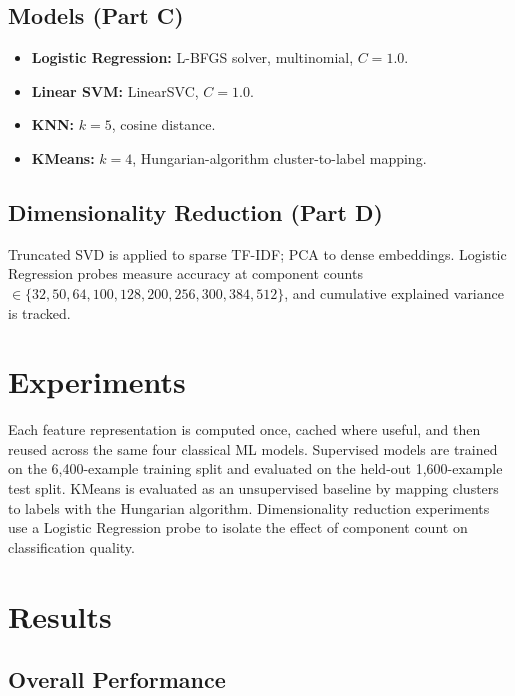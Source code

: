 \documentclass[11pt, a4paper, twocolumn]{article}
\begin{document}
\subsection{Models (Part C)}
\begin{itemize}[leftmargin=*,topsep=2pt,itemsep=1pt]
    \item \textbf{Logistic Regression:} L-BFGS solver, multinomial, $C=1.0$.
    \item \textbf{Linear SVM:} LinearSVC, $C=1.0$.
    \item \textbf{KNN:} $k=5$, cosine distance.
    \item \textbf{KMeans:} $k=4$, Hungarian-algorithm cluster-to-label mapping.
\end{itemize}

\subsection{Dimensionality Reduction (Part D)}
Truncated SVD is applied to sparse TF-IDF; PCA to dense embeddings. Logistic Regression probes measure accuracy at component counts $\in \{32, 50, 64, 100, 128, 200, 256, 300, 384, 512\}$, and cumulative explained variance is tracked.

\section{Experiments}

Each feature representation is computed once, cached where useful, and then reused across the same four classical ML models. Supervised models are trained on the 6,400-example training split and evaluated on the held-out 1,600-example test split. KMeans is evaluated as an unsupervised baseline by mapping clusters to labels with the Hungarian algorithm. Dimensionality reduction experiments use a Logistic Regression probe to isolate the effect of component count on classification quality.

\section{Results}

\subsection{Overall Performance}
\end{document}
